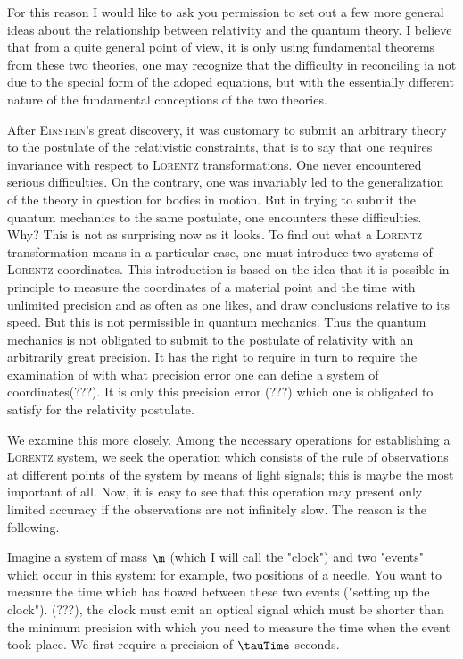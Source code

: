 \documentclass{article}
\renewcommand{\sc}[1]{\textsc{#1}}
\begin{document}
For this reason I would like to ask you permission to set out a few more general ideas about the relationship between relativity and the quantum theory. I believe that from a quite general point of view, it is only using fundamental theorems from these two theories, one may recognize that the difficulty in reconciling ia not due to the special form of the adoped equations, but with the essentially different nature of the fundamental conceptions of the two theories.

After \sc{Einstein}'s great discovery, it was customary to submit an arbitrary theory to the postulate of the relativistic constraints, that is to say that one requires invariance with respect to \sc{Lorentz} transformations. One never encountered serious difficulties. On the contrary, one was invariably led to the generalization of the theory in question for bodies in motion. But in trying to submit the quantum mechanics to the same postulate, one encounters these difficulties. Why? This is not as surprising now as it looks. To find out what a \sc{Lorentz} transformation means in a particular case, one must introduce two systems of \sc{Lorentz} coordinates. This introduction is based on the idea that it is possible in principle to measure the coordinates of a material point and the time with unlimited precision and as often as one likes, and draw conclusions relative to its speed. But this is not permissible in quantum mechanics. Thus the quantum mechanics is not obligated to submit to the postulate of relativity with an arbitrarily great precision. It has the right to require in turn to require the examination of with what precision error one can define a system of coordinates(???). It is only this precision error (???) which one is obligated to satisfy for the relativity postulate.

We examine this more closely. Among the necessary operations for establishing a \sc{Lorentz} system, we seek the operation which consists of the rule of observations at different points of the system by means of light signals; this is maybe the most important of all. Now, it is easy to see that this operation may present only limited accuracy if the observations are not infinitely slow. The reason is the following.

Imagine a system of mass $\m$ (which I will call the "clock") and two "events" which occur in this system: for example, two positions of a needle. You want to measure the time which has flowed between these two events ("setting up the clock"). (???), the clock must emit an optical signal which must be shorter than the minimum precision with which you need to measure the time when the event took place. We first require a precision of $\tauTime$ seconds.
\end{document}
